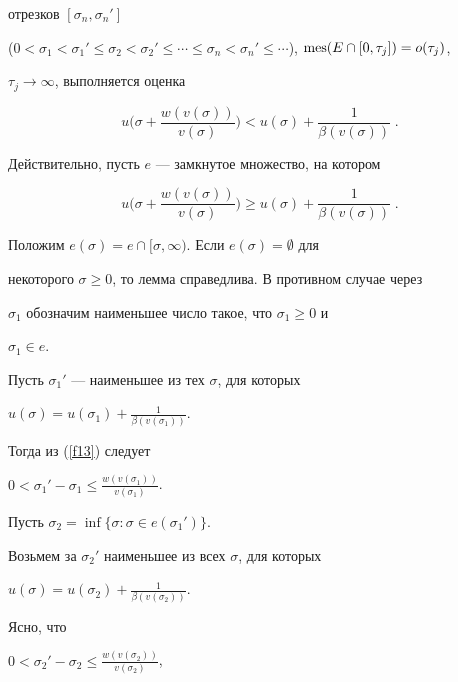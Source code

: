 отрезков $[\sigma_{n},\sigma_{n}']$


($0<\sigma_{1}<\sigma_{1}'\leq\sigma_{2}<\sigma_{2}'\leq\dotsb\leq


\sigma_{n}<\sigma_{n}'\leq\dotsb$), $\mes(E\cap[0,\tau_{j}])=o(\tau_{j})$,


$\tau_{j}\to\infty$, выполняется оценка


\begin{equation}\label{f12}


u\bigg(\sigma+ \frac{w(v(\sigma))}{v(\sigma)}\bigg)<u(\sigma)+


\frac{1}{\beta(v(\sigma))}\;.


\end{equation}


Действительно, пусть $e$ --- замкнутое множество, на котором


\begin{equation}\label{f13}


u\bigg(\sigma+ \frac{w(v(\sigma))}{v(\sigma)}\bigg)\geq u(\sigma)+


\frac{1}{\beta(v(\sigma))}\;.


\end{equation}


Положим $e(\sigma)=e\cap [\sigma,\infty)$. Если $e(\sigma)=\emptyset$ для


некоторого $\sigma\geq 0$, то лемма справедлива. В противном случае через


$\sigma_{1}$ обозначим наименьшее число такое, что $\sigma_{1}\geq 0$ и


$\sigma_{1}\in e$.





Пусть $\sigma_{1}'$ --- наименьшее из тех $\sigma$, для которых


$u(\sigma)=u(\sigma_{1})+ \frac{1}{\beta(v(\sigma_{1}))}$.


Тогда из (\ref{f13}) следует


$0<\sigma_{1}'-\sigma_{1}\leq\frac{w(v(\sigma_{1}))}{v(\sigma_{1})}$.





Пусть $\sigma_{2}=\inf \{\sigma : \sigma\in e(\sigma_{1}')\}$.


Возьмем за $\sigma_{2}'$ наименьшее из всех $\sigma$, для которых


$u(\sigma)=u(\sigma_{2})+ \frac{1}{\beta(v(\sigma_{2}))}$.


Ясно, что


$0<\sigma_{2}'-\sigma_{2}\leq\frac{w(v(\sigma_{2}))}{v(\sigma_{2})}$,


